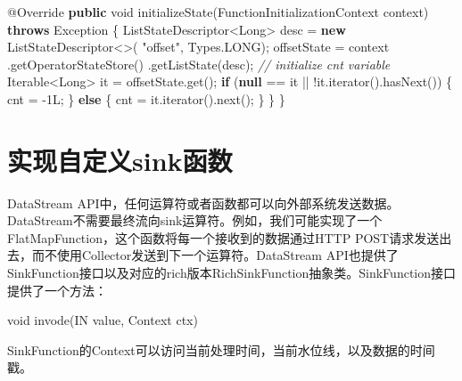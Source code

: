 \documentclass[cn,11pt,chinese]{elegantbook}
\newenvironment{Shaded}{}{}
\newcommand{\AttributeTok}[1]{\textcolor[rgb]{0.49,0.56,0.16}{#1}}
\newcommand{\BuiltInTok}[1]{#1}
\newcommand{\CommentTok}[1]{\textcolor[rgb]{0.38,0.63,0.69}{\textit{#1}}}
\newcommand{\DataTypeTok}[1]{\textcolor[rgb]{0.56,0.13,0.00}{#1}}
\newcommand{\DecValTok}[1]{\textcolor[rgb]{0.25,0.63,0.44}{#1}}
\newcommand{\FunctionTok}[1]{\textcolor[rgb]{0.02,0.16,0.49}{#1}}
\newcommand{\KeywordTok}[1]{\textcolor[rgb]{0.00,0.44,0.13}{\textbf{#1}}}
\newcommand{\NormalTok}[1]{#1}
\newcommand{\StringTok}[1]{\textcolor[rgb]{0.25,0.44,0.63}{#1}}
\begin{document}
\begin{Shaded}
\begin{Highlighting}[]
    \AttributeTok{@Override}
    \KeywordTok{public} \DataTypeTok{void} \FunctionTok{initializeState}\NormalTok{(FunctionInitializationContext context) }\KeywordTok{throws} \BuiltInTok{Exception}\NormalTok{ \{}
\NormalTok{        ListStateDescriptor\textless{}}\BuiltInTok{Long}\NormalTok{\textgreater{} desc = }\KeywordTok{new}\NormalTok{ ListStateDescriptor\textless{}\textgreater{}(}
                \StringTok{"offset"}\NormalTok{, }\BuiltInTok{Types}\NormalTok{.}\FunctionTok{LONG}\NormalTok{);}
\NormalTok{        offsetState = context}
\NormalTok{                .}\FunctionTok{getOperatorStateStore}\NormalTok{()}
\NormalTok{                .}\FunctionTok{getListState}\NormalTok{(desc);}
        \CommentTok{// initialize cnt variable}
        \BuiltInTok{Iterable}\NormalTok{\textless{}}\BuiltInTok{Long}\NormalTok{\textgreater{} it = offsetState.}\FunctionTok{get}\NormalTok{();}
        \KeywordTok{if}\NormalTok{ (}\KeywordTok{null}\NormalTok{ == it || !it.}\FunctionTok{iterator}\NormalTok{().}\FunctionTok{hasNext}\NormalTok{()) \{}
\NormalTok{            cnt = {-}}\DecValTok{1L}\NormalTok{;}
\NormalTok{        \} }\KeywordTok{else}\NormalTok{ \{}
\NormalTok{            cnt = it.}\FunctionTok{iterator}\NormalTok{().}\FunctionTok{next}\NormalTok{();}
\NormalTok{        \}}
\NormalTok{    \}}
\NormalTok{\}}
\end{Highlighting}
\end{Shaded}

\hypertarget{ux5b9eux73b0ux81eaux5b9aux4e49sinkux51fdux6570}{%
\section{实现自定义sink函数}\label{ux5b9eux73b0ux81eaux5b9aux4e49sinkux51fdux6570}}

DataStream
API中，任何运算符或者函数都可以向外部系统发送数据。DataStream不需要最终流向sink运算符。例如，我们可能实现了一个FlatMapFunction，这个函数将每一个接收到的数据通过HTTP
POST请求发送出去，而不使用Collector发送到下一个运算符。DataStream
API也提供了SinkFunction接口以及对应的rich版本RichSinkFunction抽象类。SinkFunction接口提供了一个方法：

\begin{Shaded}
\begin{Highlighting}[]
\DataTypeTok{void} \FunctionTok{invode}\NormalTok{(IN value, }\BuiltInTok{Context}\NormalTok{ ctx)}
\end{Highlighting}
\end{Shaded}

SinkFunction的Context可以访问当前处理时间，当前水位线，以及数据的时间戳。
\end{document}
